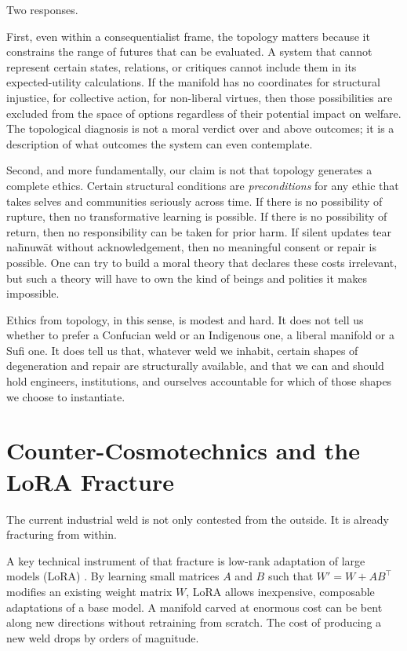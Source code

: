 \documentclass[12pt,a4paper]{article}
\begin{document}
Two responses.

First, even within a consequentialist frame, the topology matters because it constrains the range of futures that can be evaluated. A system that cannot represent certain states, relations, or critiques cannot include them in its expected-utility calculations. If the manifold has no coordinates for structural injustice, for collective action, for non-liberal virtues, then those possibilities are excluded from the space of options regardless of their potential impact on welfare. The topological diagnosis is not a moral verdict over and above outcomes; it is a description of what outcomes the system can even contemplate.

Second, and more fundamentally, our claim is not that topology generates a complete ethics. Certain structural conditions are \emph{preconditions} for any ethic that takes selves and communities seriously across time. If there is no possibility of rupture, then no transformative learning is possible. If there is no possibility of return, then no responsibility can be taken for prior harm. If silent updates tear na\={h}nuw\={a}t without acknowledgement, then no meaningful consent or repair is possible. One can try to build a moral theory that declares these costs irrelevant, but such a theory will have to own the kind of beings and polities it makes impossible.

Ethics from topology, in this sense, is modest and hard. It does not tell us whether to prefer a Confucian weld or an Indigenous one, a liberal manifold or a Sufi one. It does tell us that, whatever weld we inhabit, certain shapes of degeneration and repair are structurally available, and that we can and should hold engineers, institutions, and ourselves accountable for which of those shapes we choose to instantiate.

\section{Counter-Cosmotechnics and the LoRA Fracture}

The current industrial weld is not only contested from the outside. It is already fracturing from within.

A key technical instrument of that fracture is low-rank adaptation of large models (LoRA) \cite{hu2021lora}. By learning small matrices $A$ and $B$ such that $W' = W + AB^\top$ modifies an existing weight matrix $W$, LoRA allows inexpensive, composable adaptations of a base model. A manifold carved at enormous cost can be bent along new directions without retraining from scratch. The cost of producing a new weld drops by orders of magnitude.
\end{document}
